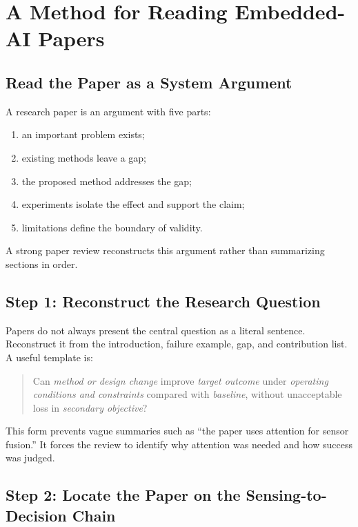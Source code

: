 \chapter{A Method for Reading Embedded-AI Papers}
\label{chap:review-method}

\section{Read the Paper as a System Argument}

A research paper is an argument with five parts:

\begin{enumerate}[label=\arabic*.]
    \item an important problem exists;
    \item existing methods leave a gap;
    \item the proposed method addresses the gap;
    \item experiments isolate the effect and support the claim;
    \item limitations define the boundary of validity.
\end{enumerate}

A strong paper review reconstructs this argument rather than summarizing sections in order.

\section{Step 1: Reconstruct the Research Question}

Papers do not always present the central question as a literal sentence. Reconstruct it from the introduction, failure example, gap, and contribution list. A useful template is:

\begin{quote}
Can \textit{method or design change} improve \textit{target outcome} under \textit{operating conditions and constraints} compared with \textit{baseline}, without unacceptable loss in \textit{secondary objective}?
\end{quote}

This form prevents vague summaries such as ``the paper uses attention for sensor fusion.'' It forces the review to identify why attention was needed and how success was judged.

\section{Step 2: Locate the Paper on the Sensing-to-Decision Chain}

